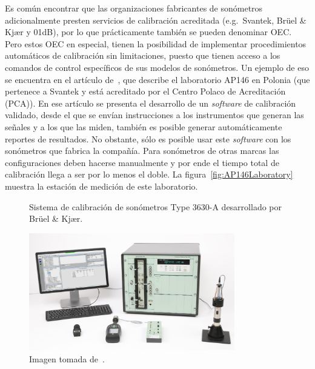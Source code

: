 Es común encontrar que las organizaciones fabricantes de sonómetros adicionalmente presten servicios de calibración
acreditada (e.g.\ Svantek, Brüel \& Kjær y 01dB), por lo que prácticamente también se pueden denominar OEC\@.
Pero estos OEC en especial, tienen la posibilidad de implementar procedimientos automáticos de calibración sin
limitaciones, puesto que tienen acceso a los comandos de control específicos de sus modelos de sonómetros.
Un ejemplo de eso se encuentra en el artículo de~\cite{Podgorski2016}, que describe el laboratorio
AP146 en Polonia (que pertenece a Svantek y está acreditado por el Centro Polaco de Acreditación (PCA)).
En ese artículo se presenta el desarrollo de un \emph{software} de calibración validado, desde el que se envían
instrucciones a los instrumentos que generan las señales y a los que las miden, también es posible generar
automáticamente reportes de resultados.
No obstante, sólo es posible usar este \emph{software} con los sonómetros que fabrica la compañía.
Para sonómetros de otras marcas las configuraciones deben hacerse manualmente y por ende el tiempo total de calibración
llega a ser por lo menos el doble.
La figura~\ref{fig:AP146Laboratory} muestra la estación de medición de este laboratorio.

\begin{figure}[!h]
    \caption{Sistema de calibración de sonómetros Type 3630-A desarrollado por Brüel \& Kjær.}
    \label{fig:BK3630A}
    \centering
    \includegraphics[width=0.8\textwidth]{1_Intro/BK3630A}
    \caption*{\footnotesize Imagen tomada de~\cite{BruelKjaer2000}.}
\end{figure}

